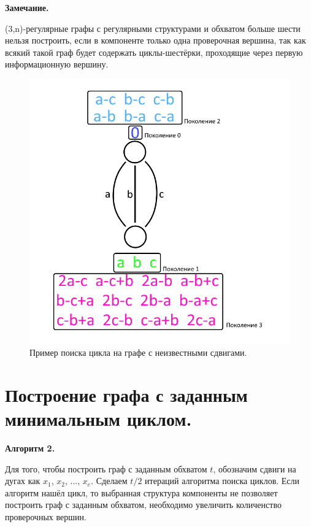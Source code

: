 \documentclass[14pt]{mmcs_article}
\begin{document}
\textbf{Замечание.}

(3,n)-регулярные графы с регулярными структурами и обхватом больше шести нельзя построить, если в компоненте только одна проверочная вершина, так как всякий такой граф будет содержать циклы-шестёрки, проходящие через первую информационную вершину.
 
\begin{figure}[H]
  \centering
  \includegraphics[scale=0.6]{Fig_5.png}
  \caption{ Пример поиска цикла на графе с неизвестными сдвигами. }
  \label{stud:fig:5}
\end{figure}
   
\newpage

\section{Построение графа с заданным минимальным циклом.}

\textbf{Алгоритм 2.}

Для того, чтобы построить граф с заданным обхватом $t$, обозначим сдвиги на дугах как $x_1$, $x_2$, ..., $x_e$. Сделаем $t/2$ итераций алгоритма поиска циклов. Если алгоритм нашёл цикл, то выбранная структура компоненты не позволяет построить граф с заданным обхватом, необходимо увеличить количенство проверочных вершин.
\end{document}
